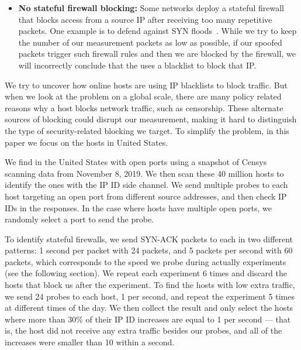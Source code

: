 \begin{itemize}
    \item \textbf{No stateful firewall blocking:}
    Some networks deploy a stateful firewall that blocks access from a source IP
    after receiving too many repetitive packets. One example is to defend
    against SYN floods~\cite{lemon2002resisting}. While we try to keep the number
    of our measurement packets as low as possible, if our spoofed packets trigger such
    firewall rules and then we are blocked by the firewall, we will incorrectly
    conclude that the {} uses a blacklist to block that IP.
\end{itemize}

We try to uncover how online hosts are using IP blacklists to
block traffic. But when we look at the problem on a global scale, there are
many policy related reasons why a host blocks network traffic,
such as censorship. These alternate sources of blocking could disrupt our
measurement, making it hard to distinguish the type of security-related blocking we target.
To simplify the problem, in this paper we focus on the hosts in
United States.


We find {} in the United States with open ports using a snapshot
of Censys~\cite{censys} scanning data from November 8, 2019. We
then scan these 40 million hosts to identify the ones with the IP ID side channel. We send multiple probes to each host targeting an open port from different
source addresses, and then check IP IDs in the responses. In the case where hosts have
multiple open ports, we randomly select a port to send the probe.

To identify stateful firewalls, we send SYN-ACK packets to each {}
in two different patterns: 1 second per packet with 24 packets, and 5 packets
per second with 60 packets, which corresponds to the speed we probe
{} during actually experiments (see the following section). We
repeat each experiment 6 times and discard the hosts that block us after the
experiment. To find the hosts with low extra traffic, we send 24 probes
to each host, 1 per second, and repeat the experiment 5 times at different
times of the day. We then collect the result and only select the hosts where
more than 30\% of their IP ID increases are equal to 1 per second --- that is,
the host did not receive any extra traffic besides our probes,
and all of the increases were smaller than 10 within a second.

